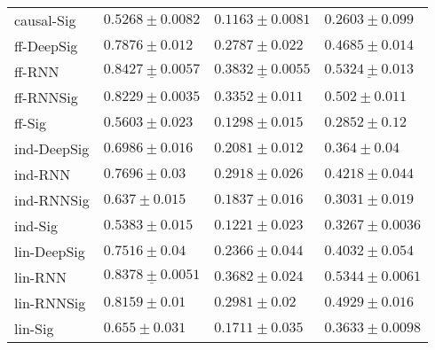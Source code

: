 \begin{tabular}{llll}
causal-Sig     &                           $ 0.5268 \pm 0.0082 $ &                           $ 0.1163 \pm 0.0081 $ &                           $ 0.2603 \pm 0.099 $ \\
ff-DeepSig     &                            $ 0.7876 \pm 0.012 $ &                            $ 0.2787 \pm 0.022 $ &                           $ 0.4685 \pm 0.014 $ \\
ff-RNN         &  $  \mathbf{ \underline{ 0.8427 \pm 0.0057 }} $ &  $  \mathbf{ \underline{ 0.3832 \pm 0.0055 }} $ &            $  \underline{ 0.5324 \pm 0.013 } $ \\
ff-RNNSig      &                           $ 0.8229 \pm 0.0035 $ &                            $ 0.3352 \pm 0.011 $ &                            $ 0.502 \pm 0.011 $ \\
ff-Sig         &                            $ 0.5603 \pm 0.023 $ &                            $ 0.1298 \pm 0.015 $ &                            $ 0.2852 \pm 0.12 $ \\
ind-DeepSig    &                            $ 0.6986 \pm 0.016 $ &                            $ 0.2081 \pm 0.012 $ &                             $ 0.364 \pm 0.04 $ \\
ind-RNN        &                             $ 0.7696 \pm 0.03 $ &                            $ 0.2918 \pm 0.026 $ &                           $ 0.4218 \pm 0.044 $ \\
ind-RNNSig     &                             $ 0.637 \pm 0.015 $ &                            $ 0.1837 \pm 0.016 $ &                           $ 0.3031 \pm 0.019 $ \\
ind-Sig        &                            $ 0.5383 \pm 0.015 $ &                            $ 0.1221 \pm 0.023 $ &                          $ 0.3267 \pm 0.0036 $ \\
lin-DeepSig    &                             $ 0.7516 \pm 0.04 $ &                            $ 0.2366 \pm 0.044 $ &                           $ 0.4032 \pm 0.054 $ \\
lin-RNN        &            $  \underline{ 0.8378 \pm 0.0051 } $ &                            $ 0.3682 \pm 0.024 $ &              $  \mathbf{ 0.5344 \pm 0.0061 } $ \\
lin-RNNSig     &                             $ 0.8159 \pm 0.01 $ &                             $ 0.2981 \pm 0.02 $ &                           $ 0.4929 \pm 0.016 $ \\
lin-Sig        &                             $ 0.655 \pm 0.031 $ &                            $ 0.1711 \pm 0.035 $ &                          $ 0.3633 \pm 0.0098 $ \\

\end{tabular}
